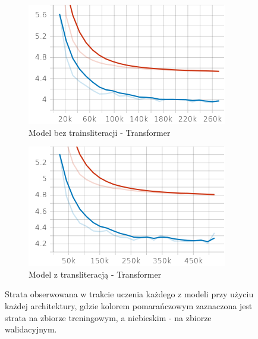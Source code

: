 \documentclass[
    left=2.5cm,         %
    right=2.5cm,        %
    top=2.5cm,          %
    bottom=3cm,         %
    bindingoffset=6mm,  %
    nohyphenation=false %
]{eiti/eiti-report}
\begin{document}
\begin{figure}[h]
\begin{subfigure}[b]{0.475\textwidth}
            \includegraphics[width=\textwidth]{transformer_basic_loss.png}
            \caption[]%
            {{\small Model bez trainsliteracji - Transformer}}    
            \label{fig:mean and std of net34}
        \end{subfigure}
        \hfill
        \begin{subfigure}[b]{0.475\textwidth}   
            \centering 
            \includegraphics[width=\textwidth]{transformer_romanized_loss.png}
            \caption[]%
            {{\small Model z transliteracją - Transformer}}    
            \label{fig:mean and std of net44}
        \end{subfigure}
        \caption[ The average and standard deviation of critical parameters ]
        {\small Strata obserwowana w trakcie uczenia każdego z modeli przy użyciu każdej architektury, gdzie kolorem pomarańczowym zaznaczona jest strata na zbiorze treningowym, a niebieskim - na zbiorze walidacyjnym. } 
        \label{fig:mean and std of nets}
    \end{figure}
\end{document}
